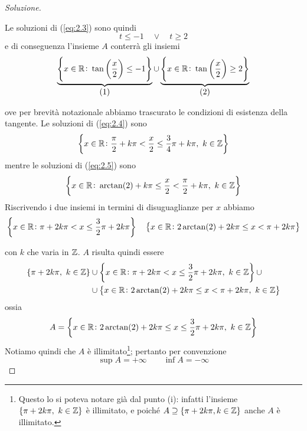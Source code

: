 \begin{proof}[Soluzione]
\begin{enumerate}[(i)]
\begin{center}
        \end{center}
        Le soluzioni di (\ref{eq:2.3}) sono quindi
        \[
        t\le-1 \quad \lor \quad t\ge 2
        \]
        e di conseguenza l'insieme $A$ conterrà gli insiemi
        \[
        \underbrace{\left\{x\in \amsbb{R} \colon \tan\left(\frac{x}{2}\right)\le -1\right\}}_{\stepcounter{equation}\mbox{(\theequation)}} \nonumber\cup \underbrace{\left\{x\in\amsbb{R}\colon \tan\left(\frac{x}{2}\right)\ge 2\right\}}_{\stepcounter{equation}\mbox{(\theequation)}}\nonumber
        \]
        \addtocounter{equation}{-2}\label{eq:2.4}
        \addtocounter{equation}{0}\label{eq:2.5}
        ove per brevità notazionale abbiamo trascurato le condizioni di esistenza della tangente.
        Le soluzioni di (\ref{eq:2.4}) sono
        \[
        \left\{x\in\amsbb{R}\colon \frac{\pi}{2}+k\pi<\frac{x}{2}\le\frac{3}{4}\pi + k\pi, \ k\in\amsbb{Z}\right\}
        \]
        mentre le soluzioni di (\ref{eq:2.5}) sono
        \[
        \left\{x\in\amsbb{R}\colon \arctan(2)+k\pi \le \frac{x}{2}<\frac{\pi}{2}+k\pi, \ k\in\amsbb{Z} \right\}
        \]
        Riscrivendo i due insiemi in termini di disuguaglianze per $x$ abbiamo
        \[
        \left\{x\in\amsbb{R}\colon \pi+2k\pi<x\le\frac{3}{2}\pi + 2k\pi \right\} \quad \left\{x\in\amsbb{R}\colon 2\arctan(2)+2k\pi\le x <\pi + 2k\pi \right\}
        \]
    \end{enumerate}
    con $k$ che varia in $\amsbb{Z}$. $A$ risulta quindi essere
    \[
    \begin{split}
        \left\{\pi + 2k\pi, \ k\in \amsbb{Z}\right\} &\cup \left\{x\in\amsbb{R}\colon \pi+2k\pi<x\le\frac{3}{2}\pi + 2k\pi, \ k\in\amsbb{Z}\right\} \cup\\
        & \cup\left\{x\in\amsbb{R}\colon 2\arctan(2)+2k\pi\le x <\pi + 2k\pi, \ k\in\amsbb{Z} \right\}
    \end{split}
    \]
    ossia
    \[
    A = \left\{x\in\amsbb{R}\colon 2\arctan(2)+2k\pi \le x \le \frac{3}{2}\pi + 2k\pi, \ k\in\amsbb{Z}\right\}
    \]
    Notiamo quindi che $A$ è illimitato\footnote{Questo lo si poteva notare già dal punto (i): infatti l'insieme $\{\pi+2k\pi, \ k\in\amsbb{Z}\}$ è illimitato, e poiché $A \supseteq \{\pi +2k\pi, k \in \amsbb{Z}\}$ anche $A$ è illimitato.}; pertanto per convenzione
    \[
    \sup A = +\infty \qquad \inf A = -\infty
    \]
\end{proof}
\newpage